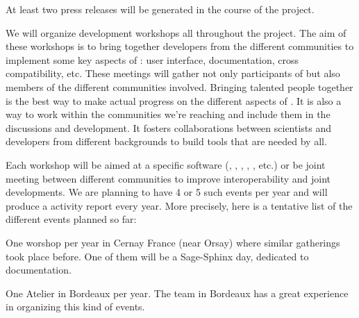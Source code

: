\begin{workpackage}
\begin{tasklist}
\begin{task}[title=Dissemination and Communication activities, id=dissemination-communication]
  At least two press releases will be generated in the course of the
  project.
\end{task}

\begin{task}[title=Community building: development workshops, lead=PS, partners={UB}, id=devel-workshops]

We will organize development workshops all throughout the project. The
aim of these workshops is to bring together developers from the
different communities to implement some key aspects of \TheProject:
user interface, documentation, cross compatibility, etc. These
meetings will gather not only participants of \TheProject but also
members of the different communities involved. Bringing talented
people together is the best way to make actual progress on the
different aspects of \TheProject. It is also a way to work within the
communities we're reaching and include them in the discussions and
development. It fosters collaborations between scientists and
developers from different backgrounds to build tools that are needed
by all.

Each workshop will be aimed at a specific software (\Sage, \GAP, \SMC,
\IPython, \Singular, etc.) or be joint meeting between different
communities to improve interoperability and joint developments. We are
planning to have 4 or 5 such events per year and will produce a
activity report every year. More precisely, here is a tentative list
of the different events planned so far:

\begin{compactitem}
\item One \Sage worshop per year in Cernay France (near Orsay) where
  similar gatherings took place before. One of them will be a
  Sage-Sphinx day, dedicated to documentation.

\item One Atelier \Pari in Bordeaux per year. The team in Bordeaux has
  a great experience in organizing this kind of \Pari events.


\end{compactitem}
\end{task}
\end{tasklist}
\end{workpackage}
